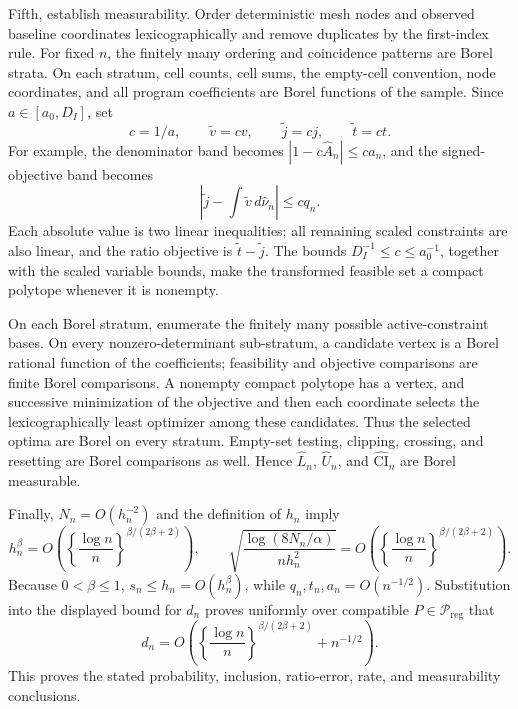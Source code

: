 Fifth, establish measurability.  Order deterministic mesh nodes and observed baseline coordinates lexicographically and remove duplicates by the first-index rule.  For fixed \(n\), the finitely many ordering and coincidence patterns are Borel strata.  On each stratum, cell counts, cell sums, the empty-cell convention, node coordinates, and all program coefficients are Borel functions of the sample.  Since \(a\in[a_0,D_I]\), set
\[
 c=1/a,
 \qquad \widetilde v=cv,
 \qquad \widetilde j=cj,
 \qquad \widetilde t=ct.
\]
For example, the denominator band becomes \(|1-c\widehat A_n|\leq ca_n\), and the signed-objective band becomes
\[
 \left|\widetilde j-\int\widetilde v\,d\widehat\nu_n\right|\leq cq_n.
\]
Each absolute value is two linear inequalities; all remaining scaled constraints are also linear, and the ratio objective is \(\widetilde t-\widetilde j\).  The bounds \(D_I^{-1}\leq c\leq a_0^{-1}\), together with the scaled variable bounds, make the transformed feasible set a compact polytope whenever it is nonempty.

On each Borel stratum, enumerate the finitely many possible active-constraint bases.  On every nonzero-determinant sub-stratum, a candidate vertex is a Borel rational function of the coefficients; feasibility and objective comparisons are finite Borel comparisons.  A nonempty compact polytope has a vertex, and successive minimization of the objective and then each coordinate selects the lexicographically least optimizer among these candidates.  Thus the selected optima are Borel on every stratum.  Empty-set testing, clipping, crossing, and resetting are Borel comparisons as well.  Hence \(\widehat L_n\), \(\widehat U_n\), and \(\widehat{\mathrm{CI}}_n\) are Borel measurable.

Finally, \(N_n=O(h_n^{-2})\) and the definition of \(h_n\) imply
\[
 h_n^\beta
 =O\!\left(\left\{\frac{\log n}{n}\right\}^{\beta/(2\beta+2)}\right),
 \qquad
 \sqrt{\frac{\log(8N_n/\alpha)}{nh_n^2}}
 =O\!\left(\left\{\frac{\log n}{n}\right\}^{\beta/(2\beta+2)}\right).
\]
Because \(0<\beta\leq1\), \(s_n\leq h_n=O(h_n^\beta)\), while \(q_n,t_n,a_n=O(n^{-1/2})\).  Substitution into the displayed bound for \(d_n\) proves uniformly over compatible \(P\in\mathcal P_{\mathrm{reg}}\) that
\[
 d_n=O\!\left(\left\{\frac{\log n}{n}\right\}^{\beta/(2\beta+2)}+n^{-1/2}\right).
\]
This proves the stated probability, inclusion, ratio-error, rate, and measurability conclusions.

